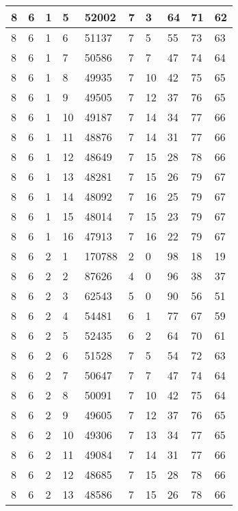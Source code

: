 \begin{table}[!ht]
\begin{tabular}{|l|l|l|l|l|l|l|l|l|l|}
        8 & 6 & 1 & 5 & 52002 & 7 & 3 & 64 & 71 & 62 \\ \hline
        8 & 6 & 1 & 6 & 51137 & 7 & 5 & 55 & 73 & 63 \\ \hline
        8 & 6 & 1 & 7 & 50586 & 7 & 7 & 47 & 74 & 64 \\ \hline
        8 & 6 & 1 & 8 & 49935 & 7 & 10 & 42 & 75 & 65 \\ \hline
        8 & 6 & 1 & 9 & 49505 & 7 & 12 & 37 & 76 & 65 \\ \hline
        8 & 6 & 1 & 10 & 49187 & 7 & 14 & 34 & 77 & 66 \\ \hline
        8 & 6 & 1 & 11 & 48876 & 7 & 14 & 31 & 77 & 66 \\ \hline
        8 & 6 & 1 & 12 & 48649 & 7 & 15 & 28 & 78 & 66 \\ \hline
        8 & 6 & 1 & 13 & 48281 & 7 & 15 & 26 & 79 & 67 \\ \hline
        8 & 6 & 1 & 14 & 48092 & 7 & 16 & 25 & 79 & 67 \\ \hline
        8 & 6 & 1 & 15 & 48014 & 7 & 15 & 23 & 79 & 67 \\ \hline
        8 & 6 & 1 & 16 & 47913 & 7 & 16 & 22 & 79 & 67 \\ \hline
        8 & 6 & 2 & 1 & 170788 & 2 & 0 & 98 & 18 & 19 \\ \hline
        8 & 6 & 2 & 2 & 87626 & 4 & 0 & 96 & 38 & 37 \\ \hline
        8 & 6 & 2 & 3 & 62543 & 5 & 0 & 90 & 56 & 51 \\ \hline
        8 & 6 & 2 & 4 & 54481 & 6 & 1 & 77 & 67 & 59 \\ \hline
        8 & 6 & 2 & 5 & 52435 & 6 & 2 & 64 & 70 & 61 \\ \hline
        8 & 6 & 2 & 6 & 51528 & 7 & 5 & 54 & 72 & 63 \\ \hline
        8 & 6 & 2 & 7 & 50647 & 7 & 7 & 47 & 74 & 64 \\ \hline
        8 & 6 & 2 & 8 & 50091 & 7 & 10 & 42 & 75 & 64 \\ \hline
        8 & 6 & 2 & 9 & 49605 & 7 & 12 & 37 & 76 & 65 \\ \hline
        8 & 6 & 2 & 10 & 49306 & 7 & 13 & 34 & 77 & 65 \\ \hline
        8 & 6 & 2 & 11 & 49084 & 7 & 14 & 31 & 77 & 66 \\ \hline
        8 & 6 & 2 & 12 & 48685 & 7 & 15 & 28 & 78 & 66 \\ \hline
        8 & 6 & 2 & 13 & 48586 & 7 & 15 & 26 & 78 & 66 \\ \hline

\end{tabular}
\end{table}
